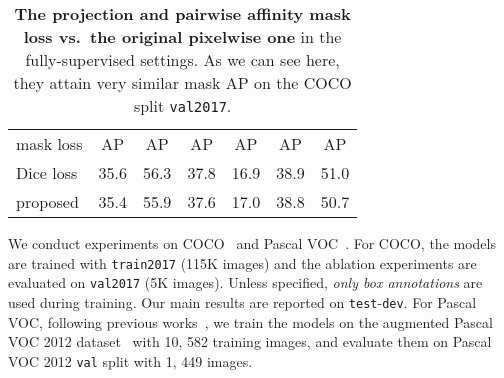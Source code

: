 \documentclass[final]{cvpr}
\newcommand{\1}{{\mathbbm{1}}}
\begin{document}
{\begin{table*}
\end{table*}

\begin{table}
\centering
\small
\begin{tabular}{ l|c|c c|c c c }
mask loss & AP & AP & AP & AP & AP & AP \\
\Xhline{2\arrayrulewidth}
Dice loss & 35.6 & 56.3 & 37.8 & 16.9 & 38.9 & 51.0 \\
proposed & 35.4 & 55.9 & 37.6 & 17.0 & 38.8 & 50.7 \\
\end{tabular}
\caption{\textbf{The projection and pairwise affinity mask loss vs.\  the original pixelwise one} in the fully-supervised settings. As
we can see here,
they attain very
similar mask AP on the COCO split \texttt{val2017}.}
\label{table:pixel_vs_pair}
\end{table}

We conduct experiments on COCO~\cite{lin2014microsoft} and Pascal VOC~\cite{everingham2010Pascal}. For COCO, the models are trained with \texttt{train2017} (115K images) and the ablation experiments are evaluated on \texttt{val2017} (5K images). Unless specified, \textit{only box annotations} are used during training. Our main results are reported on \texttt{test}-\texttt{dev}. For Pascal VOC, following previous works~\cite{hsu2019weakly, khoreva2017simple}, we train the models on the augmented Pascal VOC 2012 dataset~\cite{hariharan2011semantic} with 10, 582 training images, and evaluate them on Pascal VOC 2012 \texttt{val} split with 1, 449 images.

}
\end{document}
